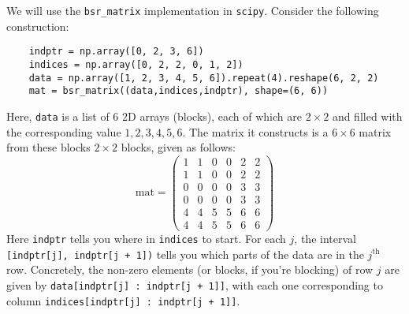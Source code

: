 We will use the \lstinline{bsr_matrix} implementation in \lstinline{scipy}. Consider the following construction:
\begin{lstlisting}
    indptr = np.array([0, 2, 3, 6])
    indices = np.array([0, 2, 2, 0, 1, 2])
    data = np.array([1, 2, 3, 4, 5, 6]).repeat(4).reshape(6, 2, 2)
    mat = bsr_matrix((data,indices,indptr), shape=(6, 6))
\end{lstlisting}
Here, \lstinline{data} is a list of 6 2D arrays (blocks), each of which are $2\times 2$ and filled with the corresponding value $1, 2, 3, 4, 5, 6$. The matrix it constructs is a $6\times 6$ matrix from these blocks $2\times 2$ blocks, given as follows:
\begin{equation}
	\mathrm{mat} = \begin{pmatrix} 
		1 & 1 & 0 & 0 & 2 & 2 \\
		1 & 1 & 0 & 0 & 2 & 2 \\
		0 & 0 & 0 & 0 & 3 & 3 \\
		0 & 0 & 0 & 0 & 3 & 3 \\
		4 & 4 & 5 & 5 & 6 & 6 \\
		4 & 4 & 5 & 5 & 6 & 6
	\end{pmatrix}
\end{equation}
Here \lstinline{indptr} tells you where in \lstinline{indices} to start. For each $j$, the interval \lstinline{[indptr[j], indptr[j + 1])} tells you which parts of the data are in the $j^\mathrm{th}$ row. Concretely, the non-zero elements (or blocks, if you're blocking) of row $j$ are given by \lstinline{data[indptr[j] : indptr[j + 1]]}, with each one corresponding to column \lstinline{indices[indptr[j] : indptr[j + 1]]}. 

